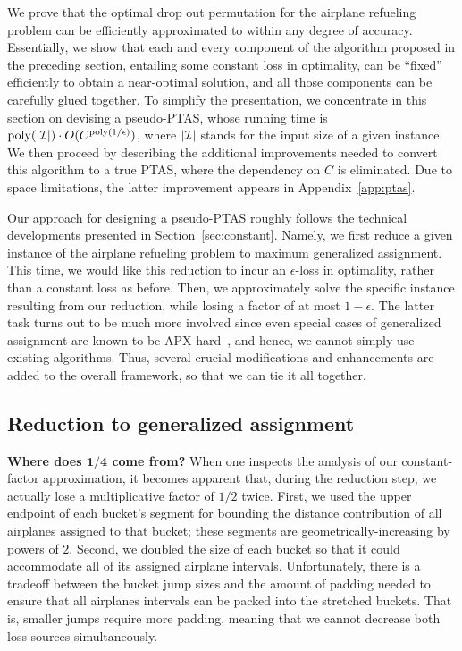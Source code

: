 \documentclass[11pt]{article}
\theoremstyle{plain}
\theoremstyle{definition}
\newcommand{\bs}[1]{\boldsymbol{#1}}
\newcommand{\poly}{\mathrm{poly}}
\begin{document}
We prove that the optimal drop out permutation for the airplane refueling problem can be efficiently approximated to within any degree of accuracy. Essentially, we show that each and every component of the algorithm proposed in the preceding section, entailing some constant loss in optimality, can be ``fixed'' efficiently to obtain a near-optimal solution, and all those components can be carefully glued together. To simplify the presentation, we concentrate in this section on devising a pseudo-PTAS, whose running time is $\poly( |{\cal I}| ) \cdot O( C^{ \poly(1/\epsilon) } )$, where $|\cal I|$ stands for the input size of a given instance. We then proceed by describing the additional improvements needed to convert this algorithm to a true PTAS, where the dependency on $C$ is eliminated. Due to space limitations, the latter improvement appears in Appendix~\ref{app:ptas}.

\smallskip {} Our approach for designing a pseudo-PTAS roughly follows the technical developments presented in Section~\ref{sec:constant}. Namely, we first reduce a given instance of the airplane refueling problem to maximum generalized assignment. This time, we would like this reduction to incur an $\epsilon$-loss in optimality, rather than a constant loss as before. Then, we approximately solve the specific instance resulting from our reduction, while losing a factor of at most $1-\epsilon$. The latter task turns out to be much more involved since even special cases of generalized assignment are known to be APX-hard~\cite{ChekuriK05}, and hence, we cannot simply use existing algorithms. Thus, several crucial modifications and enhancements are added to the overall framework, so that we can tie it all together.

\subsection{Reduction to generalized assignment} \label{subsec:reduction_generalized_assign}

{\bf Where does $\bs{1/4}$ come from?} When one inspects the analysis of our constant-factor approximation, it becomes apparent that, during the reduction step, we actually lose a multiplicative factor of $1/2$ twice. First, we used the upper endpoint of each bucket's segment for bounding the distance contribution of all airplanes assigned to that bucket; these segments are geometrically-increasing by powers of $2$. Second, we doubled the size of each bucket so that it could accommodate all of its assigned airplane intervals. Unfortunately, there is a tradeoff between the bucket jump sizes and the amount of padding needed to ensure that all airplanes intervals can be packed into the stretched buckets. That is, smaller jumps require more padding, meaning that we cannot decrease both loss sources simultaneously.
\end{document}
